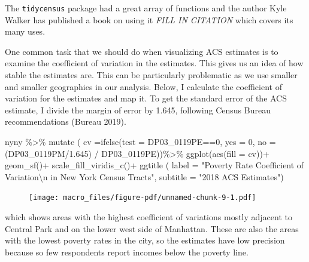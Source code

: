 \documentclass[
  letterpaper,
  DIV=11,
  numbers=noendperiod]{scrreprt}
\newenvironment{Shaded}{\begin{snugshade}}{\end{snugshade}}
\newcommand{\AttributeTok}[1]{\textcolor[rgb]{0.40,0.45,0.13}{#1}}
\newcommand{\DecValTok}[1]{\textcolor[rgb]{0.68,0.00,0.00}{#1}}
\newcommand{\FloatTok}[1]{\textcolor[rgb]{0.68,0.00,0.00}{#1}}
\newcommand{\FunctionTok}[1]{\textcolor[rgb]{0.28,0.35,0.67}{#1}}
\newcommand{\NormalTok}[1]{\textcolor[rgb]{0.00,0.23,0.31}{#1}}
\newcommand{\SpecialCharTok}[1]{\textcolor[rgb]{0.37,0.37,0.37}{#1}}
\newcommand{\StringTok}[1]{\textcolor[rgb]{0.13,0.47,0.30}{#1}}
\begin{document}
The \texttt{tidycensus} package had a great array of functions and the
author Kyle Walker has published a book on using it \emph{FILL IN
CITATION} which covers its many uses.

One common task that we should do when visualizing ACS estimates is to
examine the coefficient of variation in the estimates. This gives us an
idea of how stable the estimates are. This can be particularly
problematic as we use smaller and smaller geographies in our analysis.
Below, I calculate the coefficient of variation for the estimates and
map it. To get the standard error of the ACS estimate, I divide the
margin of error by 1.645, following Census Bureau recommendations
(Bureau 2019).

\begin{Shaded}
\begin{Highlighting}[]
\NormalTok{nyny }\SpecialCharTok{\%\textgreater{}\%} 
  \FunctionTok{mutate}\NormalTok{ ( }\AttributeTok{cv =}\FunctionTok{ifelse}\NormalTok{(}\AttributeTok{test =}\NormalTok{ DP03\_0119PE}\SpecialCharTok{==}\DecValTok{0}\NormalTok{,}
                      \AttributeTok{yes =} \DecValTok{0}\NormalTok{,}
                      \AttributeTok{no =}\NormalTok{ (DP03\_0119PM}\SpecialCharTok{/}\FloatTok{1.645}\NormalTok{) }\SpecialCharTok{/}\NormalTok{ DP03\_0119PE))}\SpecialCharTok{\%\textgreater{}\%}
  \FunctionTok{ggplot}\NormalTok{(}\FunctionTok{aes}\NormalTok{(}\AttributeTok{fill =}\NormalTok{ cv))}\SpecialCharTok{+}
  \FunctionTok{geom\_sf}\NormalTok{()}\SpecialCharTok{+}
  \FunctionTok{scale\_fill\_viridis\_c}\NormalTok{()}\SpecialCharTok{+}
  \FunctionTok{ggtitle}\NormalTok{ ( }\AttributeTok{label =} \StringTok{"Poverty Rate Coefficient of Variation}\SpecialCharTok{\textbackslash{}n}\StringTok{ in New York Census Tracts"}\NormalTok{, }
            \AttributeTok{subtitle =} \StringTok{"2018 ACS Estimates"}\NormalTok{)}
\end{Highlighting}
\end{Shaded}

\begin{figure}[H]

{\centering \texttt{[image: macro\_files/figure-pdf/unnamed-chunk-9-1.pdf]}

}

\end{figure}

which shows areas with the highest coefficient of variations mostly
adjacent to Central Park and on the lower west side of Manhattan. These
are also the areas with the lowest poverty rates in the city, so the
estimates have low precision because so few respondents report incomes
below the poverty line.
\end{document}
